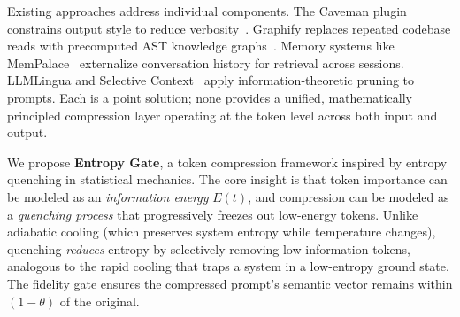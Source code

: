 \documentclass[11pt]{article}
\theoremstyle{remark}
\begin{document}
Existing approaches address individual components. The Caveman plugin
constrains output style to reduce verbosity~\cite{caveman_plugin}. Graphify
replaces repeated codebase reads with precomputed AST knowledge
graphs~\cite{graphify}. Memory systems like MemPalace~\cite{mempalace2026}
externalize conversation history for retrieval across sessions. LLMLingua
and Selective Context~\cite{llmlingua2023,selective_context2023} apply
information-theoretic pruning to prompts. Each is a point solution; none
provides a unified, mathematically principled compression layer operating
at the token level across both input and output.

We propose \textbf{Entropy Gate}, a token compression framework inspired by
entropy quenching in statistical mechanics. The core insight is that token
importance can be modeled as an \emph{information energy} $E(t)$, and
compression can be modeled as a \emph{quenching process} that progressively
freezes out low-energy tokens. Unlike adiabatic cooling (which preserves
system entropy while temperature changes), quenching \emph{reduces} entropy
by selectively removing low-information tokens, analogous to the rapid
cooling that traps a system in a low-entropy ground state. The fidelity gate
ensures the compressed prompt's semantic vector remains within $(1-\theta)$
of the original.
\end{document}
